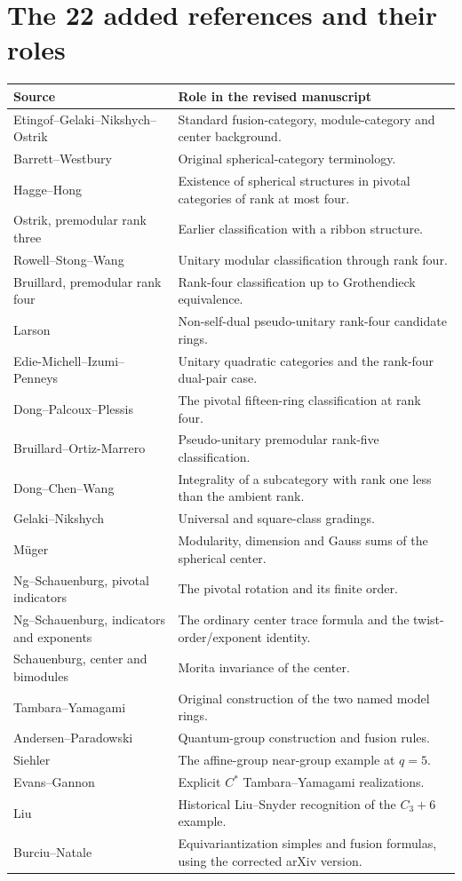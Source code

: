 \documentclass[11pt,a4paper]{article}
\begin{document}
\section*{The 22 added references and their roles}

\begin{center}\small
\begin{tabular}{@{}p{.37\linewidth}p{.59\linewidth}@{}}
\toprule
Source & Role in the revised manuscript\\\midrule
Etingof--Gelaki--Nikshych--Ostrik & Standard fusion-category, module-category and center background.\\
Barrett--Westbury & Original spherical-category terminology.\\
Hagge--Hong & Existence of spherical structures in pivotal categories of rank at most four.\\
Ostrik, premodular rank three & Earlier classification with a ribbon structure.\\
Rowell--Stong--Wang & Unitary modular classification through rank four.\\
Bruillard, premodular rank four & Rank-four classification up to Grothendieck equivalence.\\
Larson & Non-self-dual pseudo-unitary rank-four candidate rings.\\
Edie-Michell--Izumi--Penneys & Unitary quadratic categories and the rank-four dual-pair case.\\
Dong--Palcoux--Plessis & The pivotal fifteen-ring classification at rank four.\\
Bruillard--Ortiz-Marrero & Pseudo-unitary premodular rank-five classification.\\
Dong--Chen--Wang & Integrality of a subcategory with rank one less than the ambient rank.\\
Gelaki--Nikshych & Universal and square-class gradings.\\
M\"uger & Modularity, dimension and Gauss sums of the spherical center.\\
Ng--Schauenburg, pivotal indicators & The pivotal rotation and its finite order.\\
Ng--Schauenburg, indicators and exponents & The ordinary center trace formula and the twist-order/exponent identity.\\
Schauenburg, center and bimodules & Morita invariance of the center.\\
Tambara--Yamagami & Original construction of the two named model rings.\\
Andersen--Paradowski & Quantum-group construction and fusion rules.\\
Siehler & The affine-group near-group example at $q=5$.\\
Evans--Gannon & Explicit $C^*$ Tambara--Yamagami realizations.\\
Liu & Historical Liu--Snyder recognition of the $C_3+6$ example.\\
Burciu--Natale & Equivariantization simples and fusion formulas, using the corrected arXiv version.\\
\bottomrule
\end{tabular}
\end{center}
\end{document}
